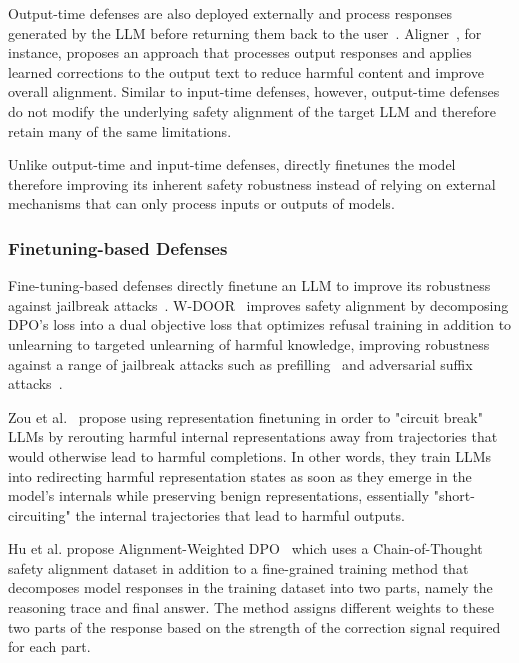 Output-time defenses are also deployed externally and process responses generated by the LLM before returning them back to the user~\cite{Inan2023llamaguard, ji2024aligner}. Aligner~\cite{ji2024aligner}, for instance, proposes an approach that processes output responses and applies learned corrections to the output text to reduce harmful content and improve overall alignment. Similar to input-time defenses, however, output-time defenses do not modify the underlying safety alignment of the target LLM and therefore retain many of the same limitations.

Unlike output-time and input-time defenses, \method directly finetunes the model therefore improving its inherent safety robustness instead of relying on external mechanisms that can only process inputs or outputs of models.

\subsubsection{Finetuning-based Defenses}

Fine-tuning-based defenses directly finetune an LLM to improve its robustness against jailbreak attacks~\cite{zou2024circuit, hu2026alignmentweighted, qi2025deep, zhao2025door}. W-DOOR~\cite{zhao2025door} improves safety alignment by decomposing DPO's loss into a dual objective loss that optimizes refusal training in addition to unlearning to targeted unlearning of harmful knowledge, improving robustness against a range of jailbreak attacks such as prefilling~\cite{wei2023jailbroken} and adversarial suffix attacks~\cite{zou2023GCG}.

Zou et al.~\cite{zou2024circuit} propose using representation finetuning in order to "circuit break" LLMs by rerouting harmful internal representations away from trajectories that would otherwise lead to harmful completions. In other words, they train LLMs into redirecting harmful representation states as soon as they emerge in the model's internals while preserving benign representations, essentially "short-circuiting" the internal trajectories that lead to harmful outputs. 

Hu et al. propose Alignment-Weighted DPO~\cite{hu2026alignmentweighted} which uses a Chain-of-Thought safety alignment dataset in addition to a fine-grained training method that decomposes model responses in the training dataset into two parts, namely the reasoning trace and final answer. The method assigns different weights to these two parts of the response based on the strength of the correction signal required for each part.


